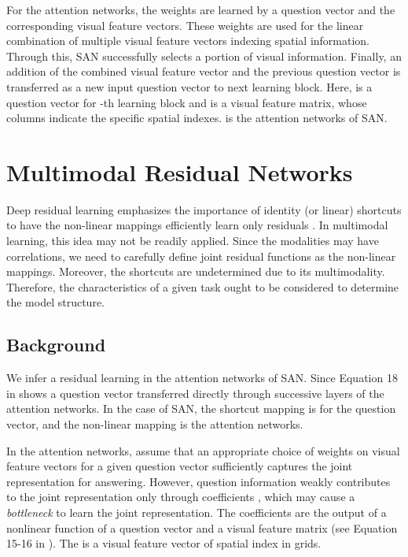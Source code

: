 \documentclass{article}
\begin{document}
For the attention networks, the weights are learned by a question vector and the corresponding visual feature vectors. These weights are used for the linear combination of multiple visual feature vectors indexing spatial information. Through this, SAN successfully selects a portion of visual information. Finally, an addition of the combined visual feature vector and the previous question vector is transferred as a new input question vector to next learning block. 
Here,  is a question vector for -th learning block and  is a visual feature matrix, whose columns indicate the specific spatial indexes.  is the attention networks of SAN.

\section{Multimodal Residual Networks}
\label{sec:MRN}

Deep residual learning emphasizes the importance of identity (or linear) shortcuts to have the non-linear mappings efficiently learn only residuals \cite{He2015}. In multimodal learning, this idea may not be readily applied. Since the modalities may have correlations, we need to carefully define joint residual functions as the non-linear mappings. Moreover, the shortcuts are undetermined due to its multimodality. Therefore, the characteristics of a given task ought to be considered to determine the model structure.

\subsection{Background}
\label{subsec:background}

We infer a residual learning in the attention networks of SAN. Since Equation 18 in \cite{Yang2015} shows a question vector transferred directly through successive layers of the attention networks. In the case of SAN, the shortcut mapping is for the question vector, and the non-linear mapping is the attention networks.

In the attention networks, \citet{Yang2015} assume that an appropriate choice of weights on visual feature vectors for a given question vector sufficiently captures the joint representation for answering. However, question information weakly contributes to the joint representation only through coefficients , which may cause a \textit{bottleneck} to learn the joint representation. 
The coefficients  are the output of a nonlinear function of a question vector  and a visual feature matrix  (see Equation 15-16 in \citet{Yang2015}). The  is a visual feature vector of spatial index  in  grids.
\end{document}
